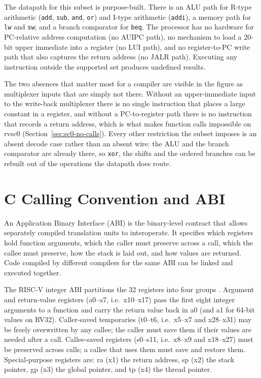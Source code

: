 The datapath for this subset is purpose-built. There is an ALU path for R-type arithmetic
(\texttt{add}, \texttt{sub}, \texttt{and}, \texttt{or}) and I-type arithmetic (\texttt{addi}), a
memory path for \texttt{lw} and \texttt{sw}; and a branch comparator for \texttt{beq}. The processor
has no hardware for PC-relative address computation (no AUIPC path), no mechanism to load a 20-bit
upper immediate into a register (no LUI path), and no register-to-PC write path that also captures
the return address (no JALR path). Executing any instruction outside the supported set produces
undefined results.



The two absences that matter most for a compiler are visible in the figure as multiplexer inputs that
are simply not there. Without an upper-immediate input to the write-back multiplexer there is no single
instruction that places a large constant in a register, and without a PC-to-register path there is no
instruction that records a return address, which is what makes function calls impossible on rvsc0
(Section~\ref{sec:sc0-no-calls}). Every other restriction the subset imposes is an absent decode case
rather than an absent wire: the ALU and the branch comparator are already there, so \texttt{xor}, the
shifts and the ordered branches can be rebuilt out of the operations the datapath does route.

\section{C Calling Convention and ABI}

An Application Binary Interface (ABI) is the binary-level contract that allows separately compiled
translation units to interoperate. It specifies which registers hold function arguments, which the
caller must preserve across a call, which the callee must preserve, how the stack is laid out, and how
values are returned. Code compiled by different compilers for the same ABI can be linked and executed
together.

The RISC-V integer ABI partitions the 32 registers into four groups \cite{riscv-psabi}. Argument and
return-value registers (a0--a7, i.e.\ x10--x17) pass the first eight integer arguments to a function
and carry the return value back in a0 (and a1 for 64-bit values on RV32). Caller-saved temporaries
(t0--t6, i.e.\ x5--x7 and x28--x31) may be freely overwritten by any callee; the caller must save
them if their values are needed after a call. Callee-saved registers (s0--s11, i.e.\ x8--x9 and
x18--x27) must be preserved across calls; a callee that uses them must save and restore them.
Special-purpose registers are: ra (x1) the return address, sp (x2) the stack pointer, gp (x3) the
global pointer, and tp (x4) the thread pointer.

